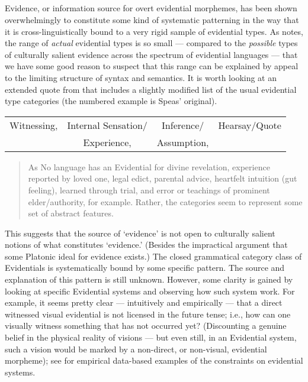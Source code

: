 \documentclass{article}
\begin{document}
\subsection{\cite{speas08synsemevd}}
Evidence, or information source for overt evidential morphemes, has been shown overwhelmingly to constitute some kind of systematic patterning in the way that it is cross-linguistically bound to a very rigid sample of evidential types. As \cite{speas04evdlogophor,speas04evdparadigms,speas08synsemevd} notes, the range of \textsl{actual} evidential types is so small --- compared to the \textsl{possible} types of culturally salient evidence across the spectrum of evidential languages --- that we have some good reason to suspect that this range can be explained by appeal to the limiting structure of syntax and semantics. It is worth looking at an extended quote from  that includes a slightly modified list of the usual evidential type categories (the numbered example is Speas' original).


\begin{exe}
 \begin{tabular}{c c c c}
Witnessing, & Internal Sensation/ & Inference/ & Hearsay/Quote\\
{} & Experience, & Assumption, & {}\\
\end{tabular}
\end{exe}
\begin{quote}
As \cite{speas04evdlogophor}No language has an Evidential for divine revelation, experience reported by loved one, legal edict, parental advice, heartfelt intuition (gut feeling), learned through trial, and error or teachings of prominent elder/authority, for example. Rather, the categories seem to represent some set of abstract features.
\end{quote}

This suggests that the source of `evidence' is not open to culturally salient notions of what constitutes `evidence.' (Besides the impractical argument that some Platonic ideal for evidence exists.) The closed grammatical category class of Evidentials is systematically bound by some specific pattern. The source and explanation of this pattern is still unknown. However, some clarity is gained by looking at specific Evidential systems and observing how such system work. For example, it seems pretty clear --- intuitively and empirically --- that a direct witnessed visual evidential is not licensed in the future tense; i.e., how can one visually witness something that has not occurred yet? (Discounting a genuine belief in the physical reality of visions --- but even still, in an Evidential system, such a vision would be marked by a non-direct, or non-visual, evidential morpheme); see \cite{aikhenvald04evd} for empirical data-based examples of the constraints on evidential systems.
\end{document}
